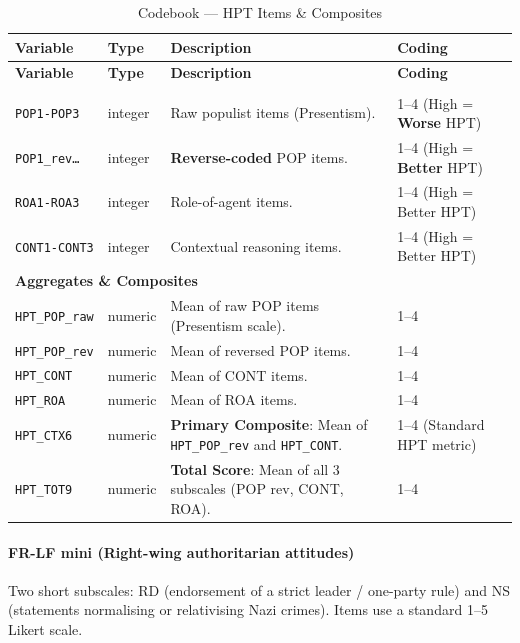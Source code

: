 \documentclass[11pt,a4paper]{article}
\begin{document}
{\small
\begin{longtable}{p{3.2cm} p{1.5cm} p{5.3cm} p{4cm}}
\caption{Codebook --- HPT Items \& Composites}\\
\toprule
\textbf{Variable} & \textbf{Type} & \textbf{Description} & \textbf{Coding}\\
\midrule
\endfirsthead
\toprule
\textbf{Variable} & \textbf{Type} & \textbf{Description} & \textbf{Coding}\\
\midrule
\endhead
\bottomrule
\endfoot

\multicolumn{4}{l}{\textbf{Item-level Data}} \\
\texttt{POP1-POP3}   & integer & Raw populist items (Presentism). & 1--4 (High = \textbf{Worse} HPT) \\
\texttt{POP1\_rev\dots} & integer & \textbf{Reverse-coded} POP items. & 1--4 (High = \textbf{Better} HPT) \\
\texttt{ROA1-ROA3}   & integer & Role-of-agent items. & 1--4 (High = Better HPT) \\
\texttt{CONT1-CONT3} & integer & Contextual reasoning items. & 1--4 (High = Better HPT) \\

\midrule
\multicolumn{4}{l}{\textbf{Aggregates \& Composites}} \\
\texttt{HPT\_POP\_raw} & numeric & Mean of raw POP items (Presentism scale). & 1--4 \\
\texttt{HPT\_POP\_rev} & numeric & Mean of reversed POP items. & 1--4 \\
\texttt{HPT\_CONT}     & numeric & Mean of CONT items. & 1--4 \\
\texttt{HPT\_ROA}      & numeric & Mean of ROA items. & 1--4 \\
\texttt{HPT\_CTX6}     & numeric & \textbf{Primary Composite}: Mean of \texttt{HPT\_POP\_rev} and \texttt{HPT\_CONT}. & 1--4 (Standard HPT metric) \\
\texttt{HPT\_TOT9}     & numeric & \textbf{Total Score}: Mean of all 3 subscales (POP rev, CONT, ROA). & 1--4 \\
\end{longtable}
}

\paragraph{FR-LF mini (Right-wing authoritarian attitudes)}
Two short subscales: RD (endorsement of a strict leader / one-party rule) and NS (statements normalising or relativising Nazi crimes). Items use a standard 1--5 Likert scale.
\end{document}
